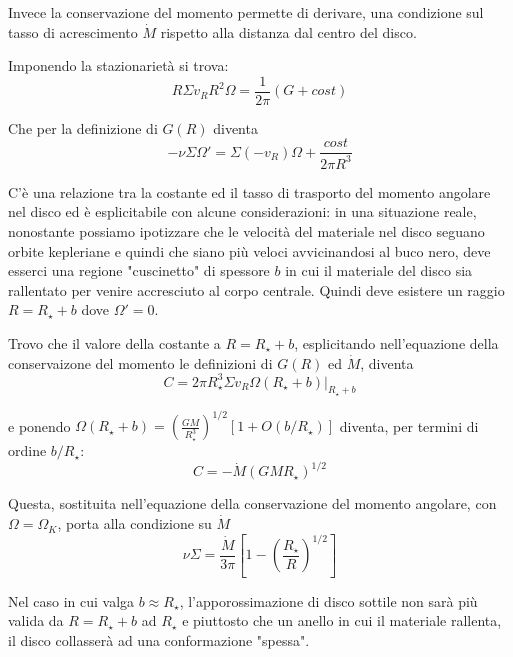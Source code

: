 \documentclass[a4paperbi]{article}
\begin{document}
	Invece la conservazione del momento permette di derivare, una condizione sul tasso di acrescimento $\dot{M}$ rispetto alla distanza dal centro del disco.
	
	Imponendo la stazionarietà si trova:
	\begin{equation}
		R\Sigma v_RR^2\Omega=\frac{1}{2\pi}(G+cost)
	\end{equation}
	
	Che per la definizione di $G(R)$ diventa
	\begin{equation}
		-\nu\Sigma\Omega'=\Sigma(-v_R)\Omega+\frac{cost}{2\pi R^3}
	\end{equation}
	
	C'è una relazione tra la costante ed il tasso di trasporto del momento angolare nel disco ed è esplicitabile con alcune considerazioni: in una situazione reale, nonostante possiamo ipotizzare che le velocità del materiale nel disco seguano orbite kepleriane e quindi che siano più veloci avvicinandosi al buco nero, deve esserci una regione "cuscinetto" di spessore $b$ in cui il materiale del disco sia rallentato per venire accresciuto al corpo centrale. Quindi deve esistere un raggio $R=R_{\star}+b$ dove $\Omega'=0$.

	Trovo che il valore della costante a $R=R_{\star}+b$, esplicitando nell'equazione della conservaizone del momento le definizioni di $G(R)$ ed $\dot{M}$, diventa
	\begin{equation*}
		C=2\pi R_{\star}^3\Sigma v_R\Omega(R_{\star}+b)\vert_{R_{\star}+b}
	\end{equation*}
	
	e ponendo $\Omega(R_{\star}+b)=\left(\frac{GM}{R_{\star}^3}\right)^{1/2}[1+O(b/R_{\star})]$ diventa, per termini di ordine $b/R_{\star}$:
	\begin{equation}
		C=-\dot{M}(GMR_{\star})^{1/2}
	\end{equation}	

	Questa, sostituita nell'equazione della conservazione del momento angolare, con $\Omega=\Omega_K$, porta alla condizione su $\dot{M}$
	\begin{equation}
		\nu\Sigma=\frac{\dot{M}}{3\pi}\left[1-\left(\frac{R_{\star}}{R}\right)^{1/2}\right]
	\end{equation}
	
	Nel caso in cui valga $b\approx R_{\star}$, l'apporossimazione di disco sottile non sarà più valida da $R=R_{\star}+b$ ad $R_{\star}$ e piuttosto che un anello in cui il materiale rallenta, il disco collasserà ad una conformazione "spessa".
	
\end{document}
